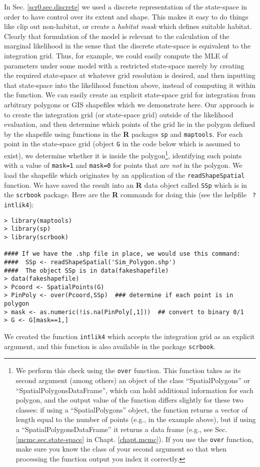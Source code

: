 In Sec. \ref{scr0.sec.discrete} we used a discrete representation of
the state-space in order to have control over its extent and
shape. This makes it easy to do things like clip out non-habitat, or
create a {\it habitat mask} which defines suitable habitat.  Clearly
that formulation of the model is relevant to the calculation of the
marginal likelihood in the sense that the discrete state-space is
equivalent to the integration grid.  Thus, for example, we could
easily compute the MLE of parameters under some model with a
restricted state-space merely by creating the required state-space at
whatever grid resolution is desired, and then inputting that
state-space into the likelihood function above, instead of computing
it within the function. We can easily create an explicit
state-space grid for integration from arbitrary polygons or GIS
shapefiles which we demonstrate here. Our approach
is to create the integration grid (or state-space grid) outside of the
likelihood evaluation, and then determine which points of the grid lie
in the polygon defined by the shapefile using functions in the {\bf R}
packages \mbox{\tt sp} and \mbox{\tt maptools}.  For each point in the
state-space grid (object \mbox{\tt G} in the code below which is
assumed to exist), we determine whether it is inside the
polygon\footnote{We perform this check using the {\tt over}
  function. This function takes as its second argument (among others)
  an object of the class ``SpatialPolygons'' or
  ``SpatialPolygonsDataFrame'', which can hold additional information
  for each polygon, and the output value of the function differs
  slightly for these two classes: if using a ``SpatialPolygons''
  object, the function returns a vector of length equal to the number
  of points (e.g., in the example above), but if using a
  ``SpatialPolygonsDataFrame'' it returns a data frame
  (e.g., see Sec. \ref{mcmc.sec.state-space} in
  Chapt. \ref{chapt.mcmc}). If you use the {\tt over} function, make
  sure you know the class of your second argument so that when
  processing the function output you index it correctly.}, identifying
such points with a value of \mbox{\tt mask=1} and \mbox{\tt mask=0}
for points that are {\it not} in the polygon.  We load the shapefile
which originates by an application of the \mbox{\tt readShapeSpatial}
function. We have saved the result into an {\bf R} data object called
\mbox{\tt SSp} which is in the \mbox{\tt scrbook} package.  Here are
the {\bf R} commands for doing this (see the helpfile \mbox{\tt
  ?intlik4}): {\small
\begin{verbatim}
> library(maptools)
> library(sp)
> library(scrbook)

#### If we have the .shp file in place, we would use this command:
####  SSp <- readShapeSpatial('Sim_Polygon.shp')
####  The object SSp is in data(fakeshapefile) 
> data(fakeshapefile)  
> Pcoord <- SpatialPoints(G)
> PinPoly <- over(Pcoord,SSp)  ### determine if each point is in polygon
> mask <- as.numeric(!is.na(PinPoly[,1]))  ## convert to binary 0/1
> G <- G[mask==1,]
\end{verbatim}
}
{\flushleft We} created  the function \mbox{\tt intlik4} which accepts the integration
grid as an explicit argument, and this function is also available in
the package  \mbox{\tt scrbook}.

